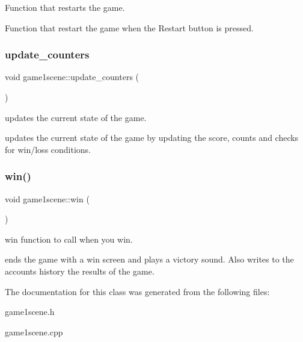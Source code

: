 Function that restarts the game. 

Function that restart the game when the Restart button is pressed. \mbox{\label{classgame1scene_a4e66bd7b75ee140431a9ae8f9fa40000}} 
\subsubsection{\texorpdfstring{update\+\_\+counters}{update\_counters}}
{\footnotesize\ttfamily void game1scene\+::update\+\_\+counters (\begin{DoxyParamCaption}{ }\end{DoxyParamCaption})\hspace{0.3cm}{\ttfamily [slot]}}



updates the current state of the game. 

updates the current state of the game by updating the score, counts and checks for win/loss conditions. \mbox{\label{classgame1scene_a760917f4ad49e991bba784f16a468f98}} 
\subsubsection{\texorpdfstring{win()}{win()}}
{\footnotesize\ttfamily void game1scene\+::win (\begin{DoxyParamCaption}{ }\end{DoxyParamCaption})}



win function to call when you win. 

ends the game with a win screen and plays a victory sound. Also writes to the account\textquotesingle{}s history the results of the game. 

The documentation for this class was generated from the following files\+:\begin{DoxyCompactItemize}
\item 
game1scene.\+h\item 
game1scene.\+cpp\end{DoxyCompactItemize}
